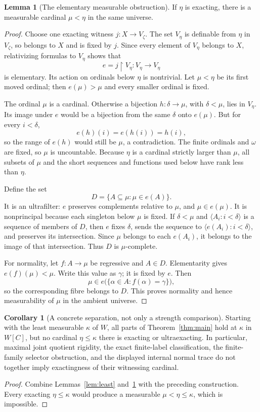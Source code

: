 \documentclass[11pt,letterpaper]{article}
\theoremstyle{definition}
\newtheorem{lemma}[definition]{Lemma}
\newtheorem{corollary}[definition]{Corollary}
\numberwithin{equation}{section}
\newcommand{\restr}{\mathbin{\upharpoonright}}
\begin{document}
\begin{lemma}[The elementary measurable obstruction]\label{lem:embedding}
If $\eta$ is exacting, there is a measurable cardinal $\mu<\eta$ in the same universe.
\end{lemma}
\begin{proof}
Choose one exacting witness $j:X\to V_\zeta$. The set $V_\eta$ is definable from $\eta$ in $V_\zeta$, so belongs to $X$ and is fixed by $j$. Since every element of $V_\eta$ belongs to $X$, relativizing formulas to $V_\eta$ shows that
\[
 e=j\restr V_\eta:V_\eta\longrightarrow V_\eta
\]
is elementary. Its action on ordinals below $\eta$ is nontrivial. Let $\mu<\eta$ be its first moved ordinal; then $e(\mu)>\mu$ and every smaller ordinal is fixed.

The ordinal $\mu$ is a cardinal. Otherwise a bijection $h:\delta\to\mu$, with $\delta<\mu$, lies in $V_\eta$. Its image under $e$ would be a bijection from the same $\delta$ onto $e(\mu)$. But for every $i<\delta$,
\[
 e(h)(i)=e(h(i))=h(i),
\]
so the range of $e(h)$ would still be $\mu$, a contradiction. The finite ordinals and $\omega$ are fixed, so $\mu$ is uncountable. Because $\eta$ is a cardinal strictly larger than $\mu$, all subsets of $\mu$ and the short sequences and functions used below have rank less than $\eta$.

Define the set
\[
 D=\{A\subseteq\mu:\mu\in e(A)\}.
\]
It is an ultrafilter: $e$ preserves complements relative to $\mu$, and $\mu\in e(\mu)$. It is nonprincipal because each singleton below $\mu$ is fixed. If $\delta<\mu$ and $\langle A_i:i<\delta\rangle$ is a sequence of members of $D$, then $e$ fixes $\delta$, sends the sequence to $\langle e(A_i):i<\delta\rangle$, and preserves its intersection. Since $\mu$ belongs to each $e(A_i)$, it belongs to the image of that intersection. Thus $D$ is $\mu$-complete.

For normality, let $f:A\to\mu$ be regressive and $A\in D$. Elementarity gives $e(f)(\mu)<\mu$. Write this value as $\gamma$; it is fixed by $e$. Then
\[
 \mu\in e\bigl(\{\alpha\in A:f(\alpha)=\gamma\}\bigr),
\]
so the corresponding fibre belongs to $D$. This proves normality and hence measurability of $\mu$ in the ambient universe.
\end{proof}

\begin{corollary}[A concrete separation, not only a strength comparison]\label{cor:separate}
Starting with the least measurable $\kappa$ of $W$, all parts of Theorem~\ref{thm:main} hold at $\kappa$ in $W[C]$, but no cardinal $\eta\leq\kappa$ there is exacting or ultraexacting. In particular, maximal joint quotient rigidity, the exact finite-label classification, the finite-family selector obstruction, and the displayed internal normal trace do not together imply exactingness of their witnessing cardinal.
\end{corollary}
\begin{proof}
Combine Lemmas~\ref{lem:least} and~\ref{lem:embedding} with the preceding construction. Every exacting $\eta\leq\kappa$ would produce a measurable $\mu<\eta\leq\kappa$, which is impossible.
\end{proof}
\end{document}
